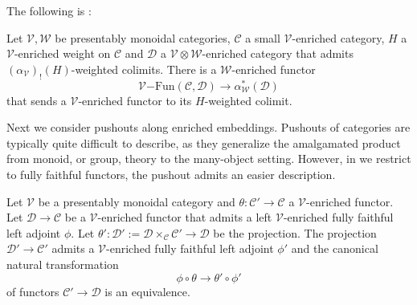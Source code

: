 \documentclass[10pt,oneside]{article}
\numberwithin{equation}{section} %
\numberwithin{figure}{section} %
\theoremstyle{plain}
\theoremstyle{definition}
\newcommand{\mC}{{\mathcal C}}
\newcommand{\mD}{{\mathcal D}}
\newcommand{\mV}{{\mathcal V}}
\newcommand{\mW}{{\mathcal W}}
\newcommand{\ot}{\otimes}
\newcommand{\Fun}{\mathrm{Fun}}
\begin{document}
The following is \cite[Proposition 3.19.]{heine2024higher}:

\begin{proposition}\label{weifunc}

Let $\mV, \mW$ be presentably monoidal categories, $\mC$ a small $\mV$-enriched category, $H$ a $\mV$-enriched weight on $\mC$ and $\mD$ a $\mV \ot \mW$-enriched category that admits $(\alpha_\mV)_!(H)$-weighted colimits.
There is a $\mW$-enriched functor 
$$ \mV\mathrm{-}\Fun(\mC,\mD) \to \alpha^*_\mW(\mD)$$
that sends a $\mV$-enriched functor to its $H$-weighted colimit.

\end{proposition}


Next we consider pushouts along enriched embeddings.
Pushouts of categories are typically quite difficult to describe, as they generalize the amalgamated product from monoid, or group, theory to the many-object setting.
However, in we restrict to fully faithful functors, the pushout admits an easier description.

\begin{lemma}\label{pulla}
Let $\mV$ be a presentably monoidal category and $\theta: \mC' \to \mC$
a $\mV$-enriched functor.
Let $\mD \to \mC$ be a $\mV$-enriched functor that admits a left
$\mV$-enriched fully faithful left adjoint $\phi$.
Let $\theta': \mD':= \mD \times_\mC \mC' \to \mD$ be the projection.
The projection $\mD' \to \mC' $ admits a $\mV$-enriched fully faithful left adjoint $\phi'$ and the canonical natural transformation
$$ \phi \circ \theta \to \theta' \circ \phi' $$
of functors $\mC'\to \mD$ is an equivalence.
    
\end{lemma}
\end{document}
